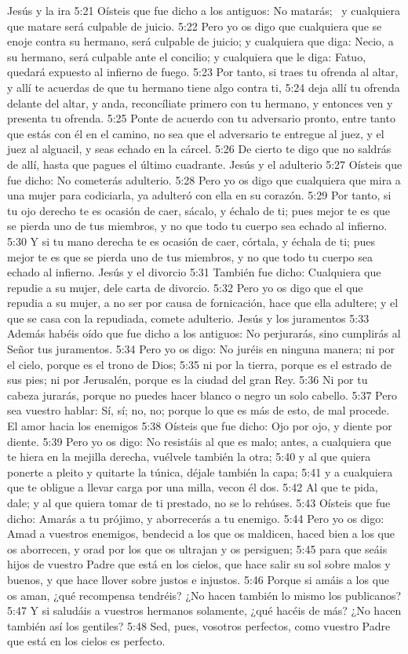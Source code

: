 Jesús y la ira  
5:21 Oísteis que fue dicho a los antiguos: No matarás;  y cualquiera que matare será culpable de juicio. 
5:22 Pero yo os digo que cualquiera que se enoje contra su hermano, será culpable de juicio; y cualquiera que diga: Necio, a su hermano, será culpable ante el concilio; y cualquiera que le diga: Fatuo, quedará expuesto al infierno de fuego. 
5:23 Por tanto, si traes tu ofrenda al altar, y allí te acuerdas de que tu hermano tiene algo contra ti, 
5:24 deja allí tu ofrenda delante del altar, y anda, reconcíliate primero con tu hermano, y entonces ven y presenta tu ofrenda. 
5:25 Ponte de acuerdo con tu adversario pronto, entre tanto que estás con él en el camino, no sea que el adversario te entregue al juez, y el juez al alguacil, y seas echado en la cárcel. 
5:26 De cierto te digo que no saldrás de allí, hasta que pagues el último cuadrante. 
Jesús y el adulterio 
5:27 Oísteis que fue dicho: No cometerás adulterio. 
5:28 Pero yo os digo que cualquiera que mira a una mujer para codiciarla, ya adulteró con ella en su corazón. 
5:29 Por tanto, si tu ojo derecho te es ocasión de caer, sácalo, y échalo de ti; pues mejor te es que se pierda uno de tus miembros, y no que todo tu cuerpo sea echado al infierno. 
5:30 Y si tu mano derecha te es ocasión de caer, córtala, y échala de ti; pues mejor te es que se pierda uno de tus miembros, y no que todo tu cuerpo sea echado al infierno. 
Jesús y el divorcio 
5:31 También fue dicho: Cualquiera que repudie a su mujer, dele carta de divorcio. 
5:32 Pero yo os digo que el que repudia a su mujer, a no ser por causa de fornicación, hace que ella adultere; y el que se casa con la repudiada, comete adulterio. 
Jesús y los juramentos 
5:33 Además habéis oído que fue dicho a los antiguos: No perjurarás, sino cumplirás al Señor tus juramentos. 
5:34 Pero yo os digo: No juréis en ninguna manera; ni por el cielo, porque es el trono de Dios; 
5:35 ni por la tierra, porque es el estrado de sus pies; ni por Jerusalén, porque es la ciudad del gran Rey. 
5:36 Ni por tu cabeza jurarás, porque no puedes hacer blanco o negro un solo cabello. 
5:37 Pero sea vuestro hablar: Sí, sí; no, no; porque lo que es más de esto, de mal procede. 
El amor hacia los enemigos  
5:38 Oísteis que fue dicho: Ojo por ojo, y diente por diente. 
5:39 Pero yo os digo: No resistáis al que es malo; antes, a cualquiera que te hiera en la mejilla derecha, vuélvele también la otra; 
5:40 y al que quiera ponerte a pleito y quitarte la túnica, déjale también la capa; 
5:41 y a cualquiera que te obligue a llevar carga por una milla, vecon él dos. 
5:42 Al que te pida, dale; y al que quiera tomar de ti prestado, no se lo rehúses. 
5:43 Oísteis que fue dicho: Amarás a tu prójimo, y aborrecerás a tu enemigo. 
5:44 Pero yo os digo: Amad a vuestros enemigos, bendecid a los que os maldicen, haced bien a los que os aborrecen, y orad por los que os ultrajan y os persiguen; 
5:45 para que seáis hijos de vuestro Padre que está en los cielos, que hace salir su sol sobre malos y buenos, y que hace llover sobre justos e injustos. 
5:46 Porque si amáis a los que os aman, ¿qué recompensa tendréis? ¿No hacen también lo mismo los publicanos? 
5:47 Y si saludáis a vuestros hermanos solamente, ¿qué hacéis de más? ¿No hacen también así los gentiles? 
5:48 Sed, pues, vosotros perfectos, como vuestro Padre que está en los cielos es perfecto. 
